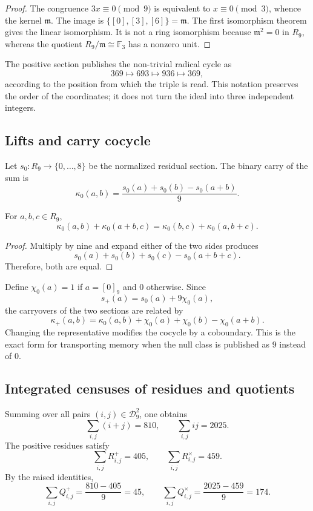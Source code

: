 \begin{proof}
The congruence \(3x\equiv0\pmod9\) is equivalent to \(x\equiv0\pmod3\), whence
the kernel \(\mathfrak m\). The image is
\(\{[0],[3],[6]\}=\mathfrak m\). The first isomorphism theorem gives the
linear isomorphism. It is not a ring isomorphism because
\(\mathfrak m^2=0\) in \(R_9\), whereas the quotient
\(R_9/\mathfrak m\cong\mathbb F_3\) has a nonzero unit.
\end{proof}

The positive section publishes the non-trivial radical cycle as
\[
 369\longmapsto693\longmapsto936\longmapsto369,
\]
according to the position from which the triple is read. This notation preserves the
order of the coordinates; it does not turn the ideal into three independent
integers.

\subsection{Lifts and carry cocycle}

Let \(s_0:R_9\to\{0,\ldots,8\}\) be the normalized residual section. The
binary carry of the sum is
\[
 \kappa_0(a,b)
 =\frac{s_0(a)+s_0(b)-s_0(a+b)}9.
\]

\begin{lemma}
\label{p12-83-c1-s1:lem:app-identidad-cociclo-acarreo}
For \(a,b,c\in R_9\),
\[
 \kappa_0(a,b)+\kappa_0(a+b,c)
 =\kappa_0(b,c)+\kappa_0(a,b+c).
\]
\end{lemma}

\begin{proof}
Multiply by nine and expand either of the two sides produces
\[
 s_0(a)+s_0(b)+s_0(c)-s_0(a+b+c).
\]
Therefore, both are equal.
\end{proof}

Define \(\chi_0(a)=1\) if \(a=[0]_9\) and \(0\) otherwise. Since
\[
 s_+(a)=s_0(a)+9\chi_0(a),
\]
the carryovers of the two sections are related by
\[
 \kappa_+(a,b)=
 \kappa_0(a,b)+\chi_0(a)+\chi_0(b)-\chi_0(a+b).
\]
Changing the representative modifies the cocycle by a coboundary. This is the
exact form for transporting memory when the null class is published as
\(9\) instead of \(0\).

\subsection{Integrated censuses of residues and quotients}

Summing over all pairs \((i,j)\in\mathcal D_9^2\), one obtains
\[
 \sum_{i,j}(i+j)=810,
 \qquad
 \sum_{i,j}ij=2025.
\]
The positive residues satisfy
\[
 \sum_{i,j}R^+_{i,j}=405,
 \qquad
 \sum_{i,j}R^\times_{i,j}=459.
\]
By the raised identities,
\[
 \sum_{i,j}Q^+_{i,j}=\frac{810-405}{9}=45,
 \qquad
 \sum_{i,j}Q^\times_{i,j}=\frac{2025-459}{9}=174.
\]

